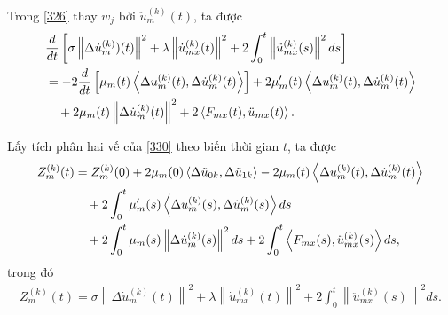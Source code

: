 \documentclass[12pt,a4paper]{article}
\theoremstyle{definition}
\theoremstyle{definition}
\begin{document}
Trong \eqref{326} thay $w_j$ bởi $\ddot{u}_m^{(k)}(t)$, ta được
\begin{align} \label{330}
    &\frac{d}{dt} \left[\sigma \left\|\Delta \dot{u}_m^{(k)})(t)\right\|^2 + \lambda \left\|\dot{u}_{mx}^{(k)}(t)\right\|^2 + 2\int_0^t \left\|\ddot{u}_{mx}^{(k)}(s)\right\|^2 ds\right] \\
    &= - 2 \frac{d}{dt} \left[\mu_m(t) \left<\Delta u_m^{(k)}(t), \Delta \dot{u}_m^{(k)}(t)\right>\right]
    + 2\mu'_m(t) \left<\Delta u_m^{(k)}(t), \Delta \dot{u}_m^{(k)}(t)\right> \notag \\
    &\quad + 2 \mu_m(t) \left\|\Delta \dot{u}_m^{(k)}(t)\right\|^2
    + 2 \left<F_{mx}(t), \ddot{u}_{mx}(t)\right>. \notag
\end{align}

Lấy tích phân hai vế của \eqref{330} theo biến thời gian $t$, ta được
\begin{align}
    Z_m^{(k)}(t) &= Z_m^{(k)}(0)
    + 2 \mu_m(0) \left< \Delta \tilde{u}_{0k}, \Delta \tilde{u}_{1k} \right>
    - 2\mu_m(t) \left<\Delta u_m^{(k)}(t), \Delta \dot{u}_m^{(k)}(t)\right> \\
    &\quad + 2 \int_0^t \mu'_m(s)\left<\Delta u_m^{(k)}(s), \Delta \dot{u}_m^{(k)}(s)\right> ds \notag \\
    &\quad + 2\int_0^t \mu_m(s) \left\|\Delta \dot{u}_m^{(k)}(s)\right\|^2 ds
    + 2 \int_0^t \left<F_{mx}(s), \ddot{u}_{mx}^{(k)}(s)\right> ds, \notag
\end{align}
trong đó
\begin{align}
    Z_m^{(k)}(t) = \sigma \left\|\Delta \dot{u}_m^{(k)}(t)\right\|^2 + \lambda \left\|\dot{u}_{mx}^{(k)}(t)\right\|^2 + 2\int_0^t \left\|\ddot{u}_{mx}^{(k)}(s)\right\|^2 ds.
\end{align}
\end{document}
